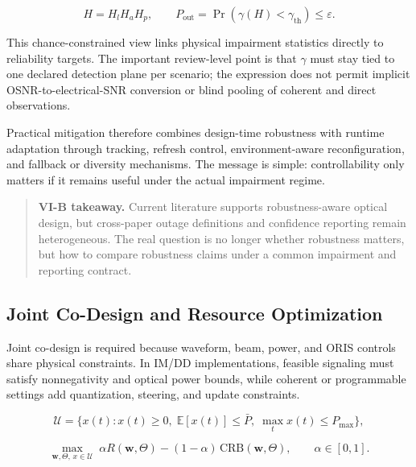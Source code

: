 \begin{equation}
\label{eq:enablers-robustness}
H = H_l H_a H_p,
\qquad
P_{\text{out}}=\Pr\!\left(\gamma(H)<\gamma_{\text{th}}\right)\le \varepsilon.
\end{equation}

This chance-constrained view links physical impairment statistics directly to reliability targets. The important review-level point is that $\gamma$ must stay tied to one declared detection plane per scenario; the expression does not permit implicit OSNR-to-electrical-SNR conversion or blind pooling of coherent and direct observations.

Practical mitigation therefore combines design-time robustness with runtime adaptation through tracking, refresh control, environment-aware reconfiguration, and fallback or diversity mechanisms. The message is simple: controllability only matters if it remains useful under the actual impairment regime.

\begin{quote}
\textbf{VI-B takeaway.} Current literature supports robustness-aware optical design, but cross-paper outage definitions and confidence reporting remain heterogeneous. The real question is no longer whether robustness matters, but how to compare robustness claims under a common impairment and reporting contract.
\end{quote}

\subsection{Joint Co-Design and Resource Optimization}
\label{sec:enablers-codesign}

Joint co-design is required because waveform, beam, power, and ORIS controls share physical constraints. In IM/DD implementations, feasible signaling must satisfy nonnegativity and optical power bounds, while coherent or programmable settings add quantization, steering, and update constraints.

\begin{equation}
\label{eq:enablers-feasible-set}
\mathcal U=\{x(t):x(t)\ge 0,\;\mathbb{E}[x(t)]\le \bar P,\;\max_t x(t)\le P_{\max}\},
\end{equation}

\begin{equation}
\label{eq:enablers-objective}
\max_{\mathbf{w},\Theta,\,x\in\mathcal U}\;\alpha R(\mathbf{w},\Theta)-(1-\alpha)\,\mathrm{CRB}(\mathbf{w},\Theta),\qquad \alpha\in[0,1].
\end{equation}

